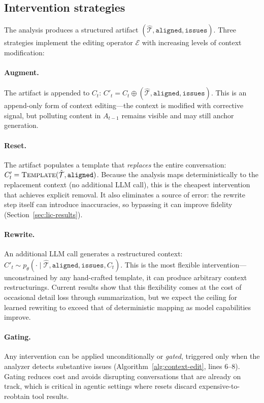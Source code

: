 \documentclass{article} %
\begin{document}
\subsection{Intervention strategies}
\label{sec:strategies}

The analysis produces a structured artifact $(\hat{\mathcal{T}}, \texttt{aligned}, \texttt{issues})$. Three strategies implement the editing operator $\mathcal{E}$ with increasing levels of context modification:

\paragraph{Augment.} The artifact is appended to $C_t$: $C'_t = C_t \oplus (\hat{\mathcal{T}}, \texttt{aligned}, \texttt{issues})$. This is an append-only form of context editing---the context is modified with corrective signal, but polluting content in $A_{t-1}$ remains visible and may still anchor generation.

\paragraph{Reset.} The artifact populates a template that \emph{replaces} the entire conversation: $C'_t = \textsc{Template}(\hat{\mathcal{T}}, \texttt{aligned})$. Because the analysis maps deterministically to the replacement context (no additional LLM call), this is the cheapest intervention that achieves explicit removal. It also eliminates a source of error: the rewrite step itself can introduce inaccuracies, so bypassing it can improve fidelity (Section~\ref{sec:lic-results}).

\paragraph{Rewrite.} An additional LLM call generates a restructured context: $C'_t \sim p_\theta(\cdot \mid \hat{\mathcal{T}}, \texttt{aligned}, \texttt{issues}, C_t)$. This is the most flexible intervention---unconstrained by any hand-crafted template, it can produce arbitrary context restructurings. Current results show that this flexibility comes at the cost of occasional detail loss through summarization, but we expect the ceiling for learned rewriting to exceed that of deterministic mapping as model capabilities improve.

\paragraph{Gating.} Any intervention can be applied unconditionally or \emph{gated}, triggered only when the analyzer detects substantive issues (Algorithm~\ref{alg:context-edit}, lines 6--8). Gating reduces cost and avoids disrupting conversations that are already on track, which is critical in agentic settings where resets discard expensive-to-reobtain tool results.
\end{document}
